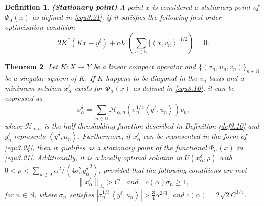 \documentclass[a4paper,12pt]{article}
\newtheorem{theorem}{Theorem}[section]
\newtheorem{definition}[theorem]{Definition}
\numberwithin{equation}{section}
\begin{document}
\begin{definition}\label{def3.11}
    \textbf{(Stationary point)} A point $x$ is considered a stationary point of $\Phi_{\alpha}\left(x\right)$ as defined in \eqref{equ3.21}, if it satisfies the following first-order optimization condition
    \begin{equation}\label{equ3.23}
        2K^{*}\left(Kx-y^{\delta}\right)+\alpha\nabla\left(\sum_{n\in\mathbb{N}} \left|\left<x,v_{n}\right>\right|^{1/2}\right) =0.
    \end{equation}
\end{definition}

\begin{theorem}\label{the3.12}
    Let $K: X\rightarrow Y$ be a linear compact operator and $\{(\sigma_{n},u_{n},v_{n})\}_{n\in\mathbb{N}}$ be a singular system of $K$. If $K$ happens to be diagonal in the $v_{n}$-basis and a minimum solution $x_{\alpha}^{\delta}$ exists for $\Phi_{\alpha}\left(x\right)$ as defined in \eqref{equ3.10}, it can be expressed as
    \begin{equation}\label{equ3.24}
        x_{\alpha}^{\delta}=\sum_{n\in\mathbb{N}}\mathcal{H}_{\alpha,n}(\sigma_{n}^{1/3}\left<y^{\delta},u_{n}\right>)v_{n},
    \end{equation}
    where $\mathcal{H}_{\alpha,n}$ is the half thresholding function described in  Definition \ref{def3.10} and $y^{\delta}_{n}$ represents $\left<y^{\delta},u_{n}\right>$. Furthermore, if $x_{\alpha}^{\delta}$ can be represented in the form of \eqref{equ3.24}, then it qualifies as a stationary point of the functional $\Phi_{\alpha}\left(x\right)$ in \eqref{equ3.21}. Additionally, it is a locally optimal solution in $U\left(x_{\alpha}^{\delta},\rho\right)$ with $0<\rho<\sum_{n\notin\Lambda}\alpha^{2} /(4\sigma_{n}^{2} {y^{\delta}_{n}}^{2})$, provided that the following conditions are met
    \begin{equation*}
       \left\|x_{\alpha}^{\delta}\right\|_{\ell_{2}}>C\quad and\quad c(\alpha)\sigma_{n}\geq 1,
    \end{equation*}
    for $n\in\mathbb{N}$, where $\sigma_{n}$ satisfies $\left|\sigma_{n}^{1/3}\left<y^{\delta},u_{n}\right>\right|>\frac{3}{4}\alpha^{2/3}$, and $c(\alpha)=2\sqrt{2}C^{3/4}$.
\end{theorem}
\end{document}

